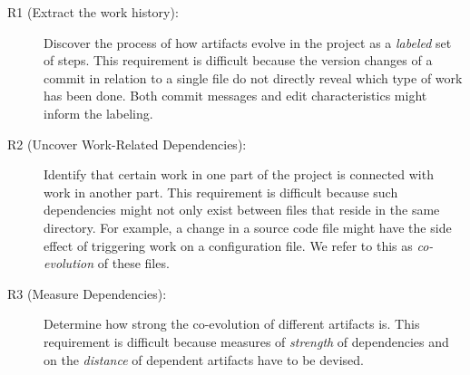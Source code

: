 \begin{description}
	\item [R1 (Extract the work history):] Discover the process of how artifacts evolve in the project as a \emph{labeled} set of steps. This requirement is difficult because the version changes of a commit in relation to a single file do not directly reveal which type of work has been done. Both commit messages and edit characteristics might inform the labeling.	
	\item [R2 (Uncover Work-Related Dependencies):] Identify that certain work in one part of the project is connected with work in another part. This requirement is difficult because such dependencies might not only exist between files that reside in the same directory. For example, a change in a source code file might have the side effect of triggering work on a configuration file. We refer to this as \emph{co-evolution} of these files.
	\item [R3 (Measure Dependencies):] Determine how strong the co-evolution of different artifacts is. This requirement is difficult because measures of \emph{strength} of dependencies and on the \emph{distance} of   dependent artifacts have to be devised.
\end{description}










